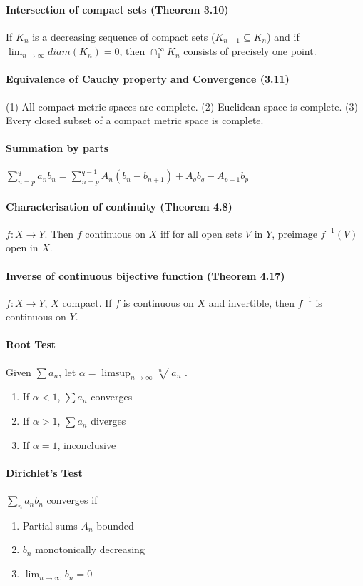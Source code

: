 \documentclass{article}
\begin{document}
	\paragraph{Intersection of compact sets (Theorem 3.10)} If $K_n$ is a decreasing sequence of compact sets ($K_{n+1}\subseteq K_n$) and if $\lim_{n\rightarrow \infty} diam(K_n) = 0$, then $\cap_1^\infty K_n$ consists of precisely one point.
	\paragraph{Equivalence of Cauchy property and Convergence (3.11)} (1) All compact metric spaces are complete. (2) Euclidean space is complete. (3) Every closed subset of a compact metric space is complete.
	\paragraph{Summation by parts}
		$\sum_{n=p}^qa_nb_n=\sum_{n=p}^{q-1}A_n(b_n-b_{n+1})+A_qb_q-A_{p-1}b_p$
	\paragraph{Characterisation of continuity (Theorem 4.8)} $f: X\rightarrow Y$. Then $f$ continuous on $X$ iff for all open sets $V$ in $Y$, preimage $f^{-1}(V)$ open in $X$.
	\paragraph{Inverse of continuous bijective function (Theorem 4.17)} $f:X\rightarrow Y$, $X$ compact. If $f$ is continuous on $X$ and invertible, then $f^{-1}$ is continuous on $Y$.
	\paragraph{Root Test} Given $\sum a_n$, let $\alpha=\limsup_{n\rightarrow \infty}\sqrt[n]{|a_n|}$.
	\begin{enumerate}
		\item If $\alpha<1$, $\sum a_n$ converges
		\item If $\alpha>1$, $\sum a_n$ diverges
		\item If $\alpha=1$, inconclusive
	\end{enumerate}
	\paragraph{Dirichlet's Test} $\sum_n a_nb_n$ converges if
	\begin{enumerate}
		\item Partial sums $A_n$ bounded
		\item $b_n$ monotonically decreasing
		\item $\lim_{n\rightarrow \infty}b_n = 0$
	\end{enumerate}
\end{document}
